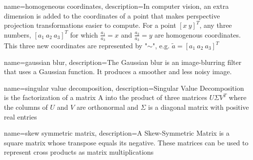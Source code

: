 
{	
	name={homogeneous coordinates}, 
	description={In computer vision, an extra dimension is added to the coordinates of a point that makes perspective projection transformations easier to compute. For a point $[x \ y]^T$, any three numbers, $[a_1 \ a_2 \ a_3]^T$ for which $\frac{a_1}{a_3} = x$ and $\frac{a_2}{a_3} = y$ are homogenous coordinates. This three new coordinates are represented by "$\sim$", e.g. $\widetilde{a} = [a_1 \ a_2 \ a_3]^T$}
}

{	
	name={gaussian blur}, 
	description={The Gaussian blur is an image-blurring filter that uses a Gaussian function. It produces a smoother and less noisy image.}
}

{
	name={singular value decomposition},
	description={Singular  Value  Decomposition is  the  factorization  of a matrix A into  the product of three matrices $U$$\Sigma$$V^T$   where the columns of $U$ and $V$ are orthonormal and $\Sigma$ is a diagonal matrix with positive real entries}
}

{
	name={skew symmetric matrix},
	description={A Skew-Symmetric Matrix is a square matrix whose transpose equals its negative. These matrices can be used to represent cross products as matrix multiplications}
}



